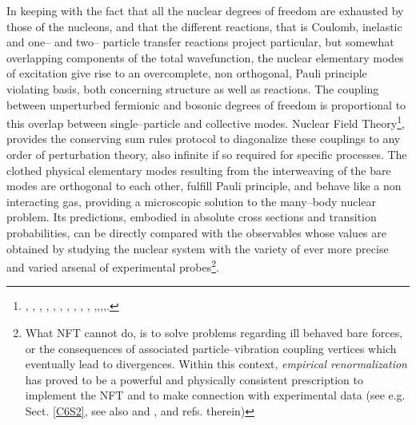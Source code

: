 In keeping with the fact that all the nuclear degrees of freedom are exhausted by those of the nucleons, and that the different reactions, that is Coulomb, inelastic and one-- and two-- particle transfer reactions project particular, but somewhat
 overlapping  components of the total wavefunction, the nuclear elementary modes of excitation give  rise to an overcomplete, non orthogonal, Pauli principle violating basis, both concerning structure as well as reactions. The coupling between unperturbed fermionic and bosonic degrees of freedom is proportional to this overlap between single--particle and collective modes. Nuclear Field Theory\footnote{\cite{Bes:76a}, \cite{Bes:76b}, \cite{Bes:76c}, \cite{Bes:75}, \cite{Broglia:76}, \cite{Bes:75b}, \cite{Mottelson:76}, \cite{Bes:77}, \cite{Bortignon:77}, \cite{Bortignon:78}, \cite{Broglia:04a},\cite{Reinhardt:75},\cite{Reinhardt:78a},\cite{Reinhardt:78b},\cite{Reinhardt:80}.}, provides the conserving sum rules protocol to diagonalize these couplings  to any order of perturbation theory, also infinite if so required for specific processes. The clothed physical elementary modes resulting from the interweaving of the bare modes are orthogonal to each other, fulfill Pauli principle, and behave like a non interacting gas, providing a microscopic solution to the many--body nuclear problem. Its predictions, embodied in absolute cross sections and transition probabilities, can be directly compared with the observables whose values are obtained by studying the nuclear system with  the variety of ever more precise and varied arsenal of experimental probes\footnote{\label{foot1}What NFT cannot do, is to solve problems regarding ill behaved bare forces, or the consequences of associated particle--vibration coupling vertices which eventually lead to divergences. Within this context, \textit{empirical renormalization} has proved to be a powerful and physically consistent prescription to implement the NFT and to make connection with experimental data (see e.g. Sect. \ref{C6S2}, see also \cite{Barranco:04} and \cite{Broglia:16}, and refs. therein)}.

